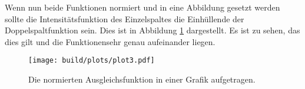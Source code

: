 \noindent Wenn nun beide Funktionen normiert und in eine Abbildung gesetzt werden sollte die Intensitätsfunktion des Einzelspaltes die Einhüllende der Doppelspaltfunktion sein.
Dies ist in Abbildung \ref{fig:plot3} dargestellt. Es ist zu sehen, das dies gilt und die Funktionensehr genau aufeinander liegen.

\begin{figure}[ht]
    \centering
    \texttt{[image: build/plots/plot3.pdf]}
    \caption{Die normierten Ausgleichsfunktion in einer Grafik aufgetragen.}
    \label{fig:plot3}
  \end{figure}